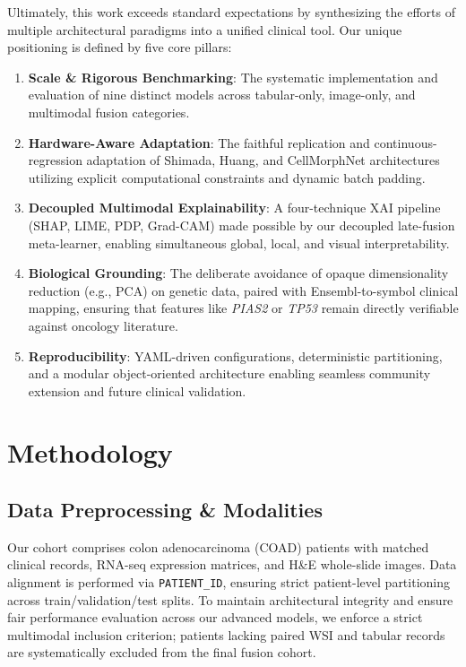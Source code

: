 \documentclass[11pt,a4paper]{article}
\begin{document}
Ultimately, this work exceeds standard expectations by synthesizing the efforts of multiple architectural paradigms into a unified clinical tool. Our unique positioning is defined by five core pillars:
\begin{enumerate}
    \item \textbf{Scale \& Rigorous Benchmarking}: The systematic implementation and evaluation of nine distinct models across tabular-only, image-only, and multimodal fusion categories.
    \item \textbf{Hardware-Aware Adaptation}: The faithful replication and continuous-regression adaptation of Shimada, Huang, and CellMorphNet architectures utilizing explicit computational constraints and dynamic batch padding.
    \item \textbf{Decoupled Multimodal Explainability}: A four-technique XAI pipeline (SHAP, LIME, PDP, Grad-CAM) made possible by our decoupled late-fusion meta-learner, enabling simultaneous global, local, and visual interpretability.
    \item \textbf{Biological Grounding}: The deliberate avoidance of opaque dimensionality reduction (e.g., PCA) on genetic data, paired with Ensembl-to-symbol clinical mapping, ensuring that features like \textit{PIAS2} or \textit{TP53} remain directly verifiable against oncology literature.
    \item \textbf{Reproducibility}: YAML-driven configurations, deterministic partitioning, and a modular object-oriented architecture enabling seamless community extension and future clinical validation.
\end{enumerate}
\section{Methodology}
\label{sec:methodology}

\subsection{Data Preprocessing \& Modalities}
\label{subsec:data}
Our cohort comprises colon adenocarcinoma (COAD) patients with matched clinical records, RNA-seq expression matrices, and H\&E whole-slide images. Data alignment is performed via \texttt{PATIENT\_ID}, ensuring strict patient-level partitioning across train/validation/test splits. To maintain architectural integrity and ensure fair performance evaluation across our advanced models, we enforce a strict multimodal inclusion criterion; patients lacking paired WSI and tabular records are systematically excluded from the final fusion cohort.
\end{document}
